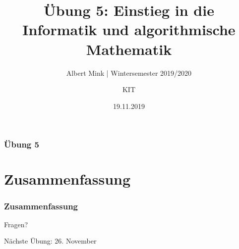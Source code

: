 \documentclass[c,18pt]{beamer}
\date{19.11.2019}
\title{Übung 5: Einstieg in die Informatik und algorithmische Mathematik}
\subtitle{Albert Mink | Wintersemester 2019/2020}
\author[Albert Mink, ]{KIT}
\institute[Institut für Angewandte und Numerische Mathematik (IANM)]{Institut für Angewandte und Numerische Mathematik}
\begin{document}
\begin{frame}
  \maketitle
\end{frame}


\begin{frame}
  \frametitle{Übung 5}%
\tableofcontents
\end{frame}


\def\kap{1}%
\setcounter{exercise}{14}
\setcounter{exercise}{15}
\setcounter{exercise}{16}
\def\kap{2}%
\def\kap{3}
\setcounter{exercise}{17}

\section{Zusammenfassung}
\begin{frame}
  \frametitle{Zusammenfassung}%
\tableofcontents[hideallsubsections]
\end{frame}

\begin{frame}
\centering
\Huge\textcolor{KITgreen}{Fragen?}
\vspace{2cm}

{\LARGE
N\"achste \"Ubung: 26. November
}
\end{frame}


\end{document}
